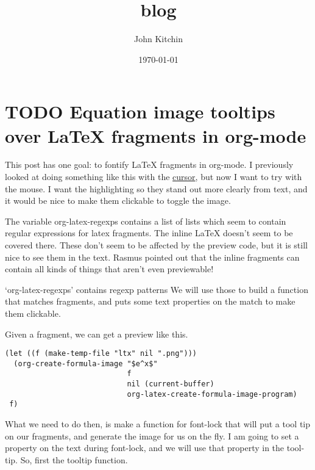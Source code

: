 \documentclass[11pt]{article}
\author{John Kitchin}
\date{\today}
\title{blog}
\begin{document}
\tableofcontents

\section{{\bfseries\sffamily TODO} Equation image tooltips over \LaTeX{} fragments in org-mode}
\label{sec-1}

This post has one  goal: to fontify \LaTeX{} fragments in org-mode. I previously looked at doing something like this with the \href{http://kitchingroup.cheme.cmu.edu/blog/2015/10/09/Automatic-latex-image-toggling-when-cursor-is-on-a-fragment/}{cursor}, but now I want to try with the mouse. I want the highlighting so they stand out more clearly from text, and it would be nice to make them clickable to toggle the image.

The variable org-latex-regexps contains a list of lists which seem to contain regular expressions for latex fragments. The inline \LaTeX{}  doesn't seem to be covered there. These don't seem to be affected by the preview code, but it is still nice to see them in the text. Rasmus pointed out that the inline fragments can contain all kinds of things that aren't even previewable!

`org-latex-regexps' contains regexp patterns We will use those to build a function that matches fragments, and puts some text properties on the match to make them clickable.

Given a fragment, we can get a preview like this.

\begin{verbatim}
(let ((f (make-temp-file "ltx" nil ".png")))
  (org-create-formula-image "$e^x$"
                            f
                            nil (current-buffer)
                            org-latex-create-formula-image-program)
 f)
\end{verbatim}

What we need to do then, is make a function for font-lock that will put a tool tip on our fragments, and generate the image for us on the fly. I am going to set a property on the text during font-lock, and we will use that property in the tool-tip. So, first the tooltip function.
\end{document}
